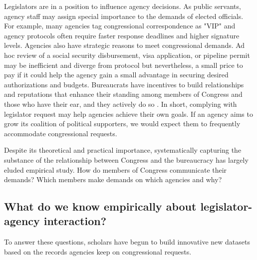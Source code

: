 \documentclass{article}
\begin{document}
Legislators are in a position to influence agency decisions. As public servants, agency staff may assign special importance to the demands of elected officials.  For example, many agencies tag congressional correspondence as "VIP" and agency protocols often require faster response deadlines and higher signature levels. 
Agencies also have strategic reasons to meet congressional demands. 
Ad hoc review of a social security disbursement, visa application, or pipeline permit may be inefficient and diverge from protocol but nevertheless, a small price to pay if it could help the agency gain a small advantage in securing desired authorizations and budgets. 
Bureaucrats have incentives to build relationships and reputations that enhance their standing among members of Congress and those who have their ear, and they actively do so \citep{Carpenter2002}. 
In short, complying with legislator request may help agencies achieve their own goals. 
If an agency aims to grow its coalition of political supporters, we would expect them to frequently accommodate congressional requests.



Despite its theoretical and practical importance, systematically capturing the substance of the relationship between Congress and the bureaucracy has largely eluded empirical study. 
How do members of Congress communicate their demands? Which members make demands on which agencies and why? 

\subsection{What do we know empirically about legislator-agency interaction?}

To answer these questions, scholars have begun to build innovative new datasets based on the records agencies keep on congressional requests. 
\end{document}

